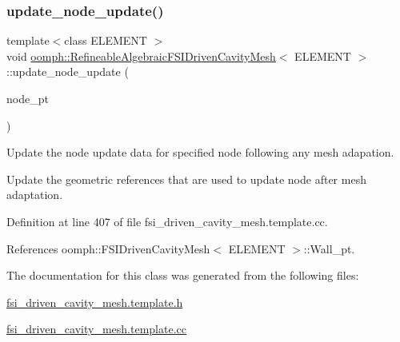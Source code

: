 \subsubsection{\texorpdfstring{update\+\_\+node\+\_\+update()}{update\_node\_update()}}
{\footnotesize\ttfamily template$<$class E\+L\+E\+M\+E\+NT $>$ \\
void \hyperlink{classoomph_1_1RefineableAlgebraicFSIDrivenCavityMesh}{oomph\+::\+Refineable\+Algebraic\+F\+S\+I\+Driven\+Cavity\+Mesh}$<$ E\+L\+E\+M\+E\+NT $>$\+::update\+\_\+node\+\_\+update (\begin{DoxyParamCaption}\item[{Algebraic\+Node $\ast$\&}]{node\+\_\+pt }\end{DoxyParamCaption})}



Update the node update data for specified node following any mesh adapation. 

Update the geometric references that are used to update node after mesh adaptation. 

Definition at line 407 of file fsi\+\_\+driven\+\_\+cavity\+\_\+mesh.\+template.\+cc.



References oomph\+::\+F\+S\+I\+Driven\+Cavity\+Mesh$<$ E\+L\+E\+M\+E\+N\+T $>$\+::\+Wall\+\_\+pt.



The documentation for this class was generated from the following files\+:\begin{DoxyCompactItemize}
\item 
\hyperlink{fsi__driven__cavity__mesh_8template_8h}{fsi\+\_\+driven\+\_\+cavity\+\_\+mesh.\+template.\+h}\item 
\hyperlink{fsi__driven__cavity__mesh_8template_8cc}{fsi\+\_\+driven\+\_\+cavity\+\_\+mesh.\+template.\+cc}\end{DoxyCompactItemize}
